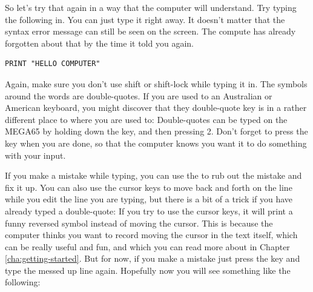   So let's try that again in a way that the computer will understand.  Try typing
  the following in.  You can just type it right away. It doesn't matter that the
  syntax error message can still be seen on the screen.  The compute has already
  forgotten about that by the time it told you  again.

\begin{tcolorbox}[colback=black,coltext=white]
\verbatimfont{\codefont}
\begin{verbatim}
PRINT "HELLO COMPUTER"
\end{verbatim}
\end{tcolorbox}

Again, make sure you don't use shift or shift-lock while typing it in.  The symbols around
the words  are double-quotes.  If you are used to an Australian or American
keyboard, you might discover that they double-quote key is in a rather different place to
where you are used to:  Double-quotes can be typed on the MEGA65 by holding down the
 key, and then pressing 2.  Don't forget to press the 
key when you are done, so that the computer knows you want it to do something with your input.

If you make a mistake while typing, you can use the  to rub out the mistake
and fix it up.  You can also use the cursor keys to move back and forth on the line while
you edit the line you are typing, but there is a bit of a trick if you have already typed
a double-quote: If you try to use the cursor keys, it will print a funny reversed symbol
instead of moving the cursor.  This is because the computer thinks you want to record
moving the cursor in the text itself, which can be really useful and fun, and which you can
read more about in Chapter \ref{cha:getting-started}. But for now, if you
make a mistake just press the  key and type the messed up line again.
Hopefully now you will see something like the following:

